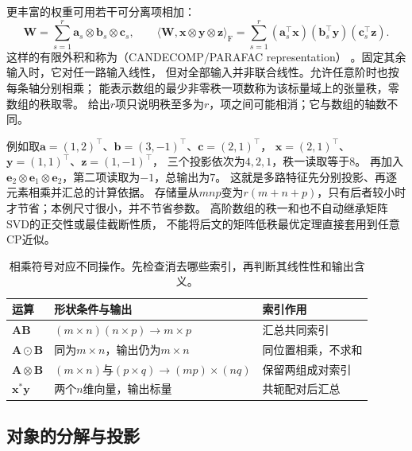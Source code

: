更丰富的权重可用若干可分离项相加：
\begin{equation}
 \bm W=\sum_{s=1}^r\bm a_s\otimes\bm b_s\otimes\bm c_s,
 \qquad
 \langle\bm W,\bm x\otimes\bm y\otimes\bm z\rangle_{\mathrm F}
 =\sum_{s=1}^r
 (\bm a_s^\top\bm x)(\bm b_s^\top\bm y)(\bm c_s^\top\bm z).
 \label{eq:linear-algebra-cp-reading}
\end{equation}
这样的有限外积和称为（CANDECOMP/PARAFAC representation）
。固定其余输入时，它对任一路输入线性，
但对全部输入并非联合线性。允许任意阶时也按每条轴分别相乘；
能表示数组的最少非零秩一项数称为该标量域上的张量秩，零数组的秩取零。
给出$r$项只说明秩至多为$r$，项之间可能相消；它与数组的轴数不同。

例如取$\bm a=(1,2)^\top$、$\bm b=(3,-1)^\top$、$\bm c=(2,1)^\top$，
$\bm x=(2,1)^\top$、$\bm y=(1,1)^\top$、$\bm z=(1,-1)^\top$，
三个投影依次为$4,2,1$，秩一读取等于$8$。
再加入$\bm e_2\otimes\bm e_1\otimes\bm e_2$，第二项读取为$-1$，总输出为$7$。
这就是多路特征先分别投影、再逐元素相乘并汇总的计算依据。
存储量从$mnp$变为$r(m+n+p)$，只有后者较小时才节省；本例尺寸很小，并不节省参数。
高阶数组的秩一和也不自动继承矩阵SVD的正交性或最佳截断性质，
不能将后文的矩阵低秩最优定理直接套用到任意CP近似。

\begin{table}[htbp]
 \centering\small
 \begin{tabularx}{\linewidth}{@{}lXX@{}}
 \toprule
 运算 & 形状条件与输出 & 索引作用\\
 \midrule
 $\bm A\bm B$ & $(m\times n)(n\times p)\to m\times p$ & 汇总共同索引\\
 $\bm A\odot\bm B$ & 同为$m\times n$，输出仍为$m\times n$ & 同位置相乘，不求和\\
 $\bm A\otimes\bm B$ & $(m\times n)$与$(p\times q)\to(mp)\times(nq)$ & 保留两组成对索引\\
 $\bm x^*\bm y$ & 两个$n$维向量，输出标量 & 共轭配对后汇总\\
 \bottomrule
 \end{tabularx}
 \caption{相乘符号对应不同操作。先检查消去哪些索引，再判断其线性性和输出含义。}
 \label{tab:linear-algebra-products-and-shapes}
\end{table}

\subsection{对象的分解与投影}
\label{sec:linear-algebra-decomposition-projection}
\label{sec:linear-algebra-length-angle-distance}

